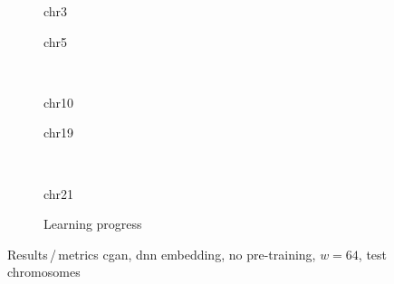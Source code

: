 \begin{figure}[p] %
    \begin{subfigure}{0.45\textwidth}
        \scriptsize
        \caption{chr3}
    \end{subfigure} \hfill
    \begin{subfigure}{0.45\textwidth}
        \scriptsize
        \caption{chr5}
    \end{subfigure}\\[5mm]
    \begin{subfigure}{0.45\textwidth}
        \scriptsize
        \caption{chr10}
    \end{subfigure}\hfill
    \begin{subfigure}{0.45\textwidth}
        \scriptsize
        \caption{chr19}
    \end{subfigure}\\[3mm]
    \begin{subfigure}{0.45\textwidth}
        \scriptsize
        \caption{chr21}
    \end{subfigure} \hfill
    \begin{subfigure}{0.45\textwidth}
        \scriptsize
        \caption{Learning progress} \label{fig:results:GAN64-dnn_lossEpochs}
    \end{subfigure}
    \caption{Results\,/\,metrics \acrshort{cgan}, \acrshort{dnn} embedding, no pre-training, $w=64$, test chromosomes}   \label{fig:results:GAN64-dnn_pearson}
\end{figure}
